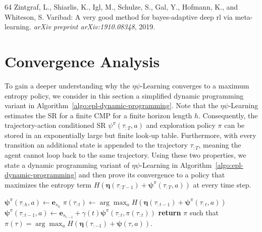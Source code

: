 \documentclass{article}
\theoremstyle{plain}
\theoremstyle{definition}
\theoremstyle{remark}
\newcommand{\alg}{$\eta$$\psi$-Learning}
\begin{document}
\begin{thebibliography}{64}
Zintgraf, L., Shiarlis, K., Igl, M., Schulze, S., Gal, Y., Hofmann, K., and
  Whiteson, S.
\newblock Varibad: A very good method for bayes-adaptive deep rl via
  meta-learning.
\newblock \emph{arXiv preprint arXiv:1910.08348}, 2019.

\end{thebibliography}



\newpage
\onecolumn
\appendix

\section{Convergence Analysis}
\label{app:convergence}

To gain a deeper understanding why the \alg{} converges to a maximum entropy policy, we consider in this section a simplified dynamic programming variant in Algorithm~\ref{algo:epl-dynamic-programming}.
Note that the \alg{} estimates the SR for a finite CMP for a finite horizon length $h$.
Consequently, the trajectory-action conditioned SR $\psi^\pi(\tau_{:T},a)$ and exploration policy $\pi$ can be stored in an exponentially large but finite look-up table.
Furthermore, with every transition an additional state is appended to the trajectory $\tau_{:T}$, meaning the agent cannot loop back to the same trajectory.
Using these two properties, we state a dynamic programming variant of \alg{} in Algorithm~\ref{algo:epl-dynamic-programming} and then prove its convergence to a policy that maximizes the entropy term $H\left( \pmb{\eta}(\tau_{:T-1}) + \pmb{\psi}^\pi(\tau_{:T},a) \right)$ at every time step.

\begin{algorithm}
  \caption{\alg{}: Dynamic Programming Framework}
  \label{algo:epl-dynamic-programming}
    \begin{algorithmic}[1]
        \STATE $\pmb{\psi}^\pi(\tau_{:h},a) \leftarrow \pmb{e}_{ s_{h} }$
    \ENDFOR
            \STATE $\pi(\tau_{:t}) \leftarrow \arg \max_{a} H\left( \pmb{\eta}(\tau_{:t-1}) + \pmb{\psi}^{\pi}(\tau_{:t},a) \right)$
            \STATE $\pmb{\psi}^\pi(\tau_{:t-1},a) \leftarrow \pmb{e}_{s_{t-1}} + \gamma(t) \pmb{\psi}^\pi(\tau_{:t}, \pi(\tau_{:t}) )$
        \ENDFOR
    \ENDFOR
    \STATE \textbf{return} $\pi$ such that $\pi(\tau) = \arg \max_a H( \pmb{\eta}(\tau_{:-1}) + \pmb{\psi}(\tau,a) )$.
    \end{algorithmic}
\end{algorithm}
\end{document}
